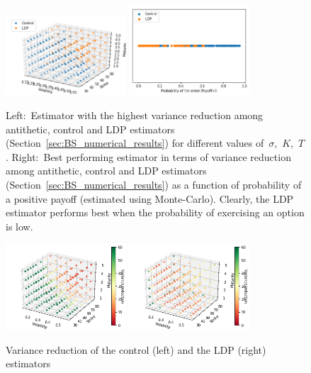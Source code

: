 \begin{figure}[H]
    \centering
    \includegraphics[width=0.4\textwidth]{content/reschap3/Figures/BS/compare1.png}
    \includegraphics[width=0.4\textwidth]{content/reschap3/Figures/BS/compare2.png}
    \caption{Left:~Estimator with the highest variance reduction among antithetic, control and LDP estimators (Section~\ref{sec:BS_numerical_results}) for different values of~$\sigma$,~$K$,~$T$. Right:~Best performing estimator in terms of variance reduction among antithetic, control and LDP estimators (Section~\ref{sec:BS_numerical_results}) as a function of probability of a positive payoff (estimated using Monte-Carlo). Clearly, the LDP estimator performs best when the probability of exercising an option is low.
    }\label{fig:BSCompare}
\end{figure}
\begin{figure}[H]
    \centering
    \includegraphics[width=0.4\textwidth]{content/reschap3/Figures/BS/control.png}
    \includegraphics[width=0.4\textwidth]{content/reschap3/Figures/BS/ldp.png}
    \caption{Variance reduction of the control (left) and 
     the LDP (right) estimators}\label{fig:BSLDP}
\end{figure}

